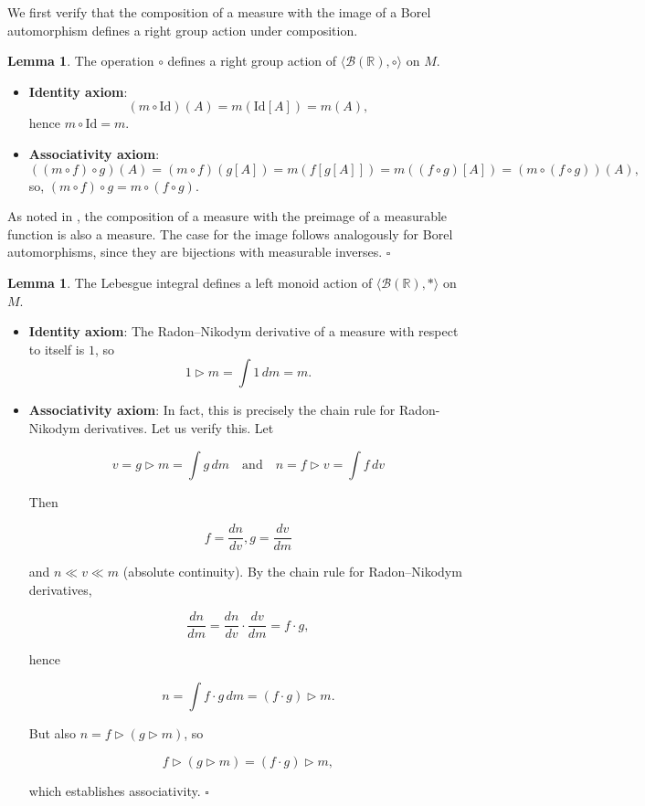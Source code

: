 \documentclass[12pt]{article}
\theoremstyle{definition}
\newtheorem{lemma}[definition]{Lemma}
\begin{document}
\vspace{10pt}
\noindent We first verify that the composition of a measure with the image of a Borel automorphism defines a right group action under composition.

\vspace{5pt}

\begin{lemma}  The operation $\circ$ defines a right group action of $\langle \mathcal{B}(\mathbb{R}), \circ \rangle$ on $M$.

\begin{itemize}
\item \textbf{Identity axiom}:  
\[
  (m \circ \mathrm{Id})(A) = m(\mathrm{Id}[A]) = m(A),
\]
  hence $m \circ \mathrm{Id} = m$.  

\item \textbf{Associativity axiom}:  
\[
  ((m \circ f) \circ g)(A) = (m \circ f)(g[A]) = m(f[g[A]]) = m((f \circ g)[A]) = (m \circ (f \circ g))(A),
\]
so, $(m \circ f) \circ g = m \circ (f \circ g)$.  
\end{itemize}

As noted in \cite{bogachev2007}, the composition of a measure with the preimage of a measurable function is also a measure. The case for the image follows analogously for Borel automorphisms, since they are bijections with measurable inverses. $\square$  
\end{lemma}


\newpage
\begin{lemma}  The Lebesgue integral defines a left monoid action of $\langle \mathcal{B}(\mathbb{R}), * \rangle$ on $M$.
  
\begin{itemize}
\item \textbf{Identity axiom}: The Radon–Nikodym derivative of a measure with respect to itself is $1$, so  
\[
  1 \triangleright m = \int 1 \, dm = m.  
\]
\item \textbf{Associativity axiom}:  
In fact, this is precisely the chain rule for Radon-Nikodym derivatives. Let us verify this. Let 

\[
v = g \triangleright m = \int g \, dm \quad \text{and} \quad n = f \triangleright v = \int f \, dv
\]

Then 

\[
f = \frac{dn}{dv}, g = \frac{dv}{dm}
\]

and $n \ll v \ll m$ (absolute continuity). By the chain rule for Radon–Nikodym derivatives,  

\[
  \frac{dn}{dm} = \frac{dn}{dv} \cdot \frac{dv}{dm} = f \cdot g,
\]

  hence  

\[
  n = \int f \cdot g \, dm = (f \cdot g) \triangleright m.
\]

  But also $n = f \triangleright (g \triangleright m)$, so  

\[
  f \triangleright (g \triangleright m) = (f \cdot g) \triangleright m,
\]

  which establishes associativity.  $\square$
\end{itemize}
\end{lemma}
\end{document}
